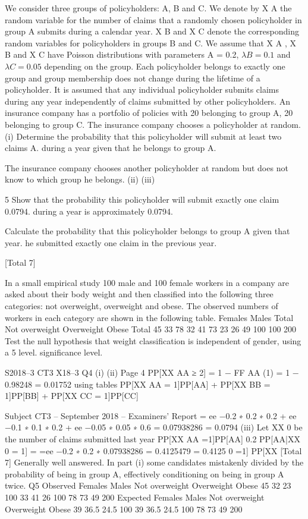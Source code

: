 \documentclass[a4paper,12pt]{article}
\begin{document}
We consider three groups of policyholders: A, B and C. We denote by X A the random
variable for the number of claims that a randomly chosen policyholder in group A
submits during a calendar year. X B and X C denote the corresponding random variables
for policyholders in groups B and C. We assume that X A , X B and X C have Poisson distributions with parameters \lambda A = 0.2, $\lambda B = 0.1$ and $\lambda C = 0.05$ depending on the group. Each policyholder belongs to exactly one group and group membership does not change during the lifetime of a policyholder. It is assumed that any individual
policyholder submits claims during any year independently of claims submitted by
other policyholders.
An insurance company has a portfolio of policies with 20%
belonging to group A, 20%
belonging to group C.
The insurance company chooses a policyholder at random.
(i)
Determine the probability that this policyholder will submit at least two claims
A.
during a year given that he belongs to group A.

The insurance company chooses another policyholder at random but does not know to
which group he belongs.
(ii)
(iii)

5
Show that the probability this policyholder will submit exactly one claim
0.0794.
during a year is approximately 0.0794.

Calculate the probability that this policyholder belongs to group A given that
year.
he submitted exactly one claim in the previous year.

[Total 7]

In a small empirical study 100 male and 100 female workers in a company are asked
about their body weight and then classified into the following three categories:
not overweight, overweight and obese. The observed numbers of workers in each
category are shown in the following table.
Females
Males
Total
Not overweight Overweight Obese Total
45
33
78 32
41
73 23
26
49 100
100
200
Test the null hypothesis that weight classification is independent of gender, using a 5%
level.
significance level.

S2018–3 
CT3 X18–3
Q4
(i)
(ii)
Page 4
PP[XX AA ≥ 2] = 1 − FF AA (1) = 1 − 0.98248 = 0.01752 using tables
PP[XX AA = 1]PP[AA] + PP[XX BB = 1]PP[BB] + PP[XX CC = 1]PP[CC]

Subject CT3  – September 2018 – Examiners’ Report
= ee −0.2 ∗ 0.2 ∗ 0.2 + ee −0.1 ∗ 0.1 ∗ 0.2 + ee −0.05 ∗ 0.05 ∗ 0.6 = 0.07938286 = 0.0794 
(iii)
Let XX 0 be the number of claims submitted last year
PP[XX AA =1]PP[AA]
0.2
PP[AA|XX 0 = 1] =
=ee −0.2 ∗ 0.2 ∗ 0.07938286 = 0.4125479 = 0.4125 
0 =1]
PP[XX
[Total 7]
Generally well answered. In part (i) some candidates mistakenly
divided by the probability of being in group A, effectively conditioning
on being in group A twice.
Q5
Observed
Females
Males
Not overweight Overweight Obese
45
32
23 100
33
41
26 100
78
73
49 200
Expected
Females
Males
Not overweight Overweight Obese
39
36.5
24.5 100
39
36.5
24.5 100
78
73
49 200
\end{document}
